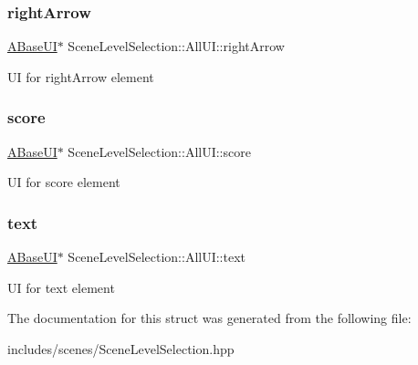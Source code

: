 \subsubsection{\texorpdfstring{right\+Arrow}{rightArrow}}
{\footnotesize\ttfamily \hyperlink{class_a_base_u_i}{A\+Base\+UI}$\ast$ Scene\+Level\+Selection\+::\+All\+U\+I\+::right\+Arrow}

UI for right\+Arrow element \mbox{\label{struct_scene_level_selection_1_1_all_u_i_a56609f362dab95f3b13aa649e1c86004}} 
\subsubsection{\texorpdfstring{score}{score}}
{\footnotesize\ttfamily \hyperlink{class_a_base_u_i}{A\+Base\+UI}$\ast$ Scene\+Level\+Selection\+::\+All\+U\+I\+::score}

UI for score element \mbox{\label{struct_scene_level_selection_1_1_all_u_i_ad2d0b933a964466a4a007a485f8e08aa}} 
\subsubsection{\texorpdfstring{text}{text}}
{\footnotesize\ttfamily \hyperlink{class_a_base_u_i}{A\+Base\+UI}$\ast$ Scene\+Level\+Selection\+::\+All\+U\+I\+::text}

UI for text element 

The documentation for this struct was generated from the following file\+:\begin{DoxyCompactItemize}
\item 
includes/scenes/Scene\+Level\+Selection.\+hpp\end{DoxyCompactItemize}
